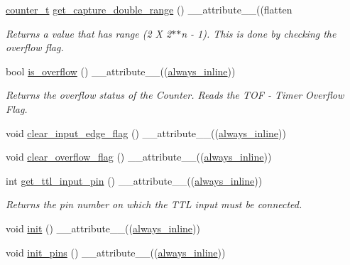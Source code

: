 \begin{DoxyCompactItemize}
\hyperlink{types_8hpp_ac89ac912f524b3e3fa3720ea55fec966}{counter\+\_\+t} \hyperlink{classTMR1Controller_a34042b5a735d4f8fd40fa36135bdec8c}{get\+\_\+capture\+\_\+double\+\_\+range} () \+\_\+\+\_\+attribute\+\_\+\+\_\+((flatten
\begin{DoxyCompactList}\small\item\em Returns a value that has range (2 X 2$\ast$$\ast$n -\/ 1). This is done by checking the overflow flag. \end{DoxyCompactList}\item 
bool \hyperlink{classTMR1Controller_a06052b4a881156be3c7a4b6495d8ca11}{is\+\_\+overflow} () \+\_\+\+\_\+attribute\+\_\+\+\_\+((\hyperlink{classTMR1Controller_adce8e8a496510485a88ccc5b88595672}{always\+\_\+inline}))
\begin{DoxyCompactList}\small\item\em Returns the overflow status of the Counter. Reads the T\+OF -\/ Timer Overflow Flag. \end{DoxyCompactList}\item 
void \hyperlink{classTMR1Controller_aa59afefa545098e53cb2e0560142526c}{clear\+\_\+input\+\_\+edge\+\_\+flag} () \+\_\+\+\_\+attribute\+\_\+\+\_\+((\hyperlink{classTMR1Controller_adce8e8a496510485a88ccc5b88595672}{always\+\_\+inline}))
\item 
void \hyperlink{classTMR1Controller_a7117e12d0cb8ec32aa6552fe541023da}{clear\+\_\+overflow\+\_\+flag} () \+\_\+\+\_\+attribute\+\_\+\+\_\+((\hyperlink{classTMR1Controller_adce8e8a496510485a88ccc5b88595672}{always\+\_\+inline}))
\item 
int \hyperlink{classTMR1Controller_a084c153e1a888f72456c54b29e3fa957}{get\+\_\+ttl\+\_\+input\+\_\+pin} () \+\_\+\+\_\+attribute\+\_\+\+\_\+((\hyperlink{classTMR1Controller_adce8e8a496510485a88ccc5b88595672}{always\+\_\+inline}))
\begin{DoxyCompactList}\small\item\em Returns the pin number on which the T\+TL input must be connected. \end{DoxyCompactList}\item 
void \hyperlink{classTMR1Controller_af92315e340766e3857eb6a20e7cab673}{init} () \+\_\+\+\_\+attribute\+\_\+\+\_\+((\hyperlink{classTMR1Controller_adce8e8a496510485a88ccc5b88595672}{always\+\_\+inline}))
\item 
void \hyperlink{classTMR1Controller_a1c5d358760aa98641333f63c7bcacd3a}{init\+\_\+pins} () \+\_\+\+\_\+attribute\+\_\+\+\_\+((\hyperlink{classTMR1Controller_adce8e8a496510485a88ccc5b88595672}{always\+\_\+inline}))

\end{DoxyCompactItemize}
